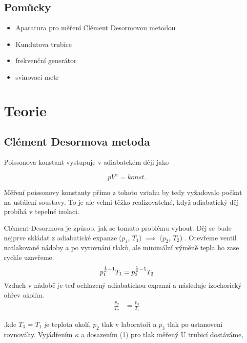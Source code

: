 \documentclass[a4paper,11pt]{article}
\begin{document}
\subsection{Pomůcky}

\begin{itemize}
  \item Aparatura pro měření Clément Desormovou metodou
  \item Kundutova trubice
  \item frekvenční generátor
  \item svinovací metr
\end{itemize}
 
\section{Teorie}

\subsection{Clément Desormova metoda}

Poissonova konstant vystupuje v adiabatckém ději jako

\begin{equation}
  pV^{\kappa} = konst.
\end{equation}

Měření poissonovy konstanty přímo z tohoto vztahu by tedy vyžadovalo počkat na ustálení soustavy.
To je ale velmi těžko realizovatelné, když adiabatický děj probíhá v tepelné izolaci.

Clément-Desormova je způsob, jak se tomuto problému vyhout. 
Děj se bude nejprve skládat z adiabatické expanze ($p_1$, $T_1$) $\implies$ ($p_2$, $T_2$) .
Otevřeme ventil natlakované nádoby a po vyrovnání tlaků, ale minimální výměně tepla ho zase rychle uzavřeme. \\
\begin{equation}
  p_1^{\frac{1}{\kappa} -1} T_1 = p_2^{\frac{1}{\kappa} -1} T_2 \\
\end{equation}
Vzduch v nádobě je teď ochlazený adiabatickou expanzí a následuje izochorický ohřev okolím. \\ 


\begin{align}
  \frac{p_2}{T_2} &= \frac{p_3}{T_3}
\end{align}

,kde $T_3$ = $T_1$ je teplota okolí, $p_2$ tlak v laboratoři a $p_3$ tlak po ustanovení rovnováhy. 
Vyjádřením $\kappa$ a dosazením (1) pro tlak měřený U trubicí dostáváme,
\end{document}
